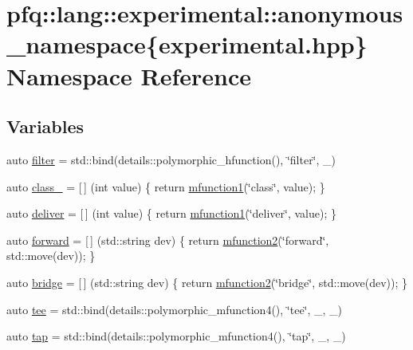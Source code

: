 \hypertarget{namespacepfq_1_1lang_1_1experimental_1_1anonymous__namespace_02experimental_8hpp_03}{\section{pfq\+:\+:lang\+:\+:experimental\+:\+:anonymous\+\_\+namespace\{experimental.\+hpp\} Namespace Reference}
\label{namespacepfq_1_1lang_1_1experimental_1_1anonymous__namespace_02experimental_8hpp_03}
}
\subsection*{Variables}
\begin{DoxyCompactItemize}
\item 
auto \hyperlink{namespacepfq_1_1lang_1_1experimental_1_1anonymous__namespace_02experimental_8hpp_03_ae9cec76098e666e9b129804f44a93ae1}{filter} = std\+::bind(details\+::polymorphic\+\_\+hfunction(), \char`\"{}filter\char`\"{}, \+\_)
\item 
auto \hyperlink{namespacepfq_1_1lang_1_1experimental_1_1anonymous__namespace_02experimental_8hpp_03_a55ce0b220b42a47460d1d40d3d5fdd5d}{class\+\_\+} = \mbox{[}$\,$\mbox{]} (int value) \{ return \hyperlink{namespacepfq_1_1lang_a68d775c68562fbd0ab9ef213f2519499}{mfunction1}(\char`\"{}class\char`\"{}, value); \}
\item 
auto \hyperlink{namespacepfq_1_1lang_1_1experimental_1_1anonymous__namespace_02experimental_8hpp_03_aabd600ebf1ee62184fa0765f49f9f990}{deliver} = \mbox{[}$\,$\mbox{]} (int value) \{ return \hyperlink{namespacepfq_1_1lang_a68d775c68562fbd0ab9ef213f2519499}{mfunction1}(\char`\"{}deliver\char`\"{}, value); \}
\item 
auto \hyperlink{namespacepfq_1_1lang_1_1experimental_1_1anonymous__namespace_02experimental_8hpp_03_a52cf166afea2ff74bffc6efbf839af0a}{forward} = \mbox{[}$\,$\mbox{]} (std\+::string dev) \{ return \hyperlink{namespacepfq_1_1lang_a67e0307b31080afb135f93398aad267c}{mfunction2}(\char`\"{}forward\char`\"{}, std\+::move(dev)); \}
\item 
auto \hyperlink{namespacepfq_1_1lang_1_1experimental_1_1anonymous__namespace_02experimental_8hpp_03_a03fc8960a5fbbe59f000bd9c5a74b7fe}{bridge} = \mbox{[}$\,$\mbox{]} (std\+::string dev) \{ return \hyperlink{namespacepfq_1_1lang_a67e0307b31080afb135f93398aad267c}{mfunction2}(\char`\"{}bridge\char`\"{}, std\+::move(dev)); \}
\item 
auto \hyperlink{namespacepfq_1_1lang_1_1experimental_1_1anonymous__namespace_02experimental_8hpp_03_a1c49a70b83c2e42067c558a8bfcf8211}{tee} = std\+::bind(details\+::polymorphic\+\_\+mfunction4(), \char`\"{}tee\char`\"{}, \+\_, \+\_)
\item 
auto \hyperlink{namespacepfq_1_1lang_1_1experimental_1_1anonymous__namespace_02experimental_8hpp_03_a66641cfa5d43270458e7fbfb626d0e2e}{tap} = std\+::bind(details\+::polymorphic\+\_\+mfunction4(), \char`\"{}tap\char`\"{}, \+\_, \+\_)
\end{DoxyCompactItemize}


